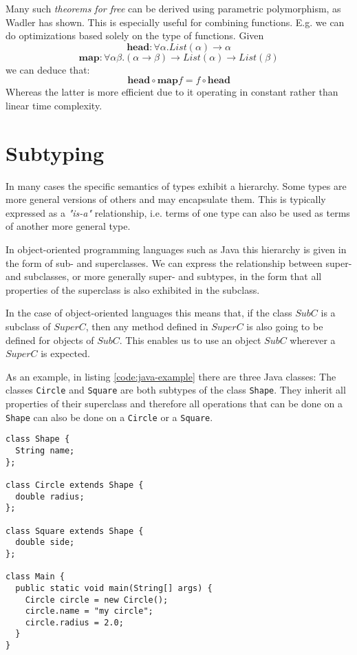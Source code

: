 Many such \emph{theorems for free} can be derived using parametric polymorphism, as Wadler has shown. \cite{wadlertheorems}
This is especially useful for combining functions.
E.g. we can do optimizations based solely on the type of functions.
Given
$$\mathbf{head}  : \forall \alpha. \mathit{List}(\alpha) \to \alpha$$
$$\mathbf{map} : \forall \alpha \beta. (\alpha \to \beta) \to \mathit{List}(\alpha) \to \mathit{List}(\beta)$$
we can deduce that: $$\mathbf{head} \circ \mathbf{map} f = f \circ \mathbf{head}$$
Whereas the latter is more efficient due to it operating in constant rather than linear time complexity.

\section{Subtyping}\label{sec:subtyping}

In many cases the specific semantics of types exhibit a hierarchy.
Some types are more general versions of others and may encapsulate them.
This is typically expressed as a \emph{"is-a"} relationship, i.e. terms of one type can also be used as terms of another more general type.

In object-oriented programming languages such as Java this hierarchy is given in the form of sub- and superclasses.
We can express the relationship between super- and subclasses, or more generally super- and subtypes,
in the form that all properties of the superclass is also exhibited in the subclass. \cite{subtyping}

In the case of object-oriented languages this means that, if the class $\mathit{SubC}$ is a subclass of $\mathit{SuperC}$,
then any method defined in $\mathit{SuperC}$ is also going to be defined for objects of $\mathit{SubC}$.
This enables us to use an object $\mathit{SubC}$ wherever a $\mathit{SuperC}$ is expected.

As an example, in listing \ref{code:java-example} there are three Java classes:
The classes \texttt{Circle} and \texttt{Square} are both subtypes of the class \texttt{Shape}.
They inherit all properties of their superclass and therefore all operations that can be done on a \texttt{Shape} can also be done on a \texttt{Circle} or a \texttt{Square}.

\begin{code}
\label{code:java-example}
\begin{verbatim}
class Shape {
  String name;
};

class Circle extends Shape {
  double radius;
};

class Square extends Shape {
  double side;
};

class Main {
  public static void main(String[] args) {
    Circle circle = new Circle();
    circle.name = "my circle";
    circle.radius = 2.0;
  }
}
\end{verbatim}
\end{code}

